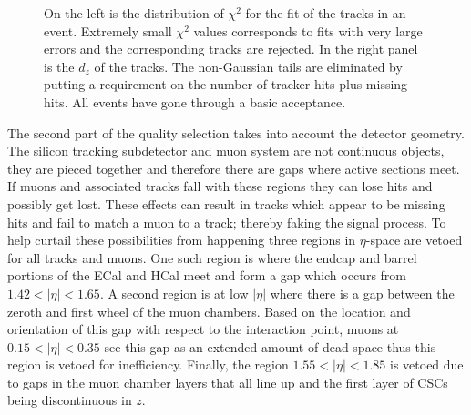 \documentclass[a4paper,12pt]{article}
\begin{document}
        \begin{figure}[ht]%
            \centering
            \caption{On the left is the distribution of $\chi^2$ for the fit of
            the tracks in an event. Extremely small $\chi^2$ values corresponds
            to fits with very large errors and the corresponding tracks are
            rejected. In the right panel is the $d_z$ of the tracks. The
            non-Gaussian tails are eliminated by putting a requirement on the
            number of tracker hits plus missing hits. All events have gone
            through a basic acceptance.}
            \label{fig:chi2}
        \end{figure}

        The second part of the quality selection takes into account the detector
        geometry. The silicon tracking subdetector and muon system are not
        continuous objects, they are pieced together and therefore there are
        gaps where active sections meet. If muons and associated tracks fall
        with these regions they can lose hits and possibly get lost. These
        effects can result in tracks which appear to be missing hits and fail to
        match a muon to a track; thereby faking the signal process. To help
        curtail these possibilities from happening three regions in $\eta$-space
        are vetoed for all tracks and muons. One such region is where the endcap
        and barrel portions of the ECal and HCal meet and form a gap which
        occurs from $1.42 < |\eta| < 1.65$. A second region is at low $|\eta|$
        where there is a gap between the zeroth and first wheel of the muon
        chambers. Based on the location and orientation of this gap with respect
        to the interaction point, muons at $0.15 < |\eta| < 0.35$ see this gap
        as an extended amount of dead space thus this region is vetoed for
        inefficiency.  Finally, the region $1.55 < |\eta| < 1.85$ is vetoed due
        to gaps in the muon chamber layers that all line up and the first layer
        of CSCs being discontinuous in $z$.
\end{document}
